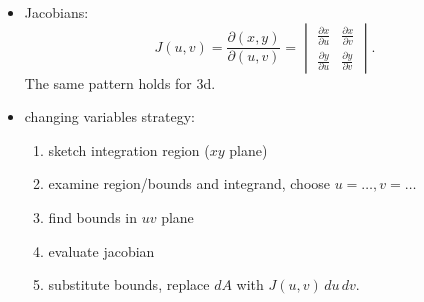 \documentclass[11pt]{article}
\theoremstyle{definition}
\begin{document}
\begin{multicols}{2}
{\begin{itemize}
\begin{itemize}
        if $T$ is one to one, $(\exists T^{-1})(T^{-1}\circ T, T\circ T^{-1})$ are id. fns.

        finding $\text{Im}_T G$? can try eval. each section of $G$'s boundry thru T.
      \end{itemize}
      \item Jacobians:
      \[ J(u,v) = \frac{\partial(x,y)}{\partial(u,v)} = \begin{vmatrix}
        \frac{\partial{x}}{\partial{u}}& \frac{\partial{x}}{\partial{v}} \\
        \frac{\partial{y}}{\partial{u}}& \frac{\partial{y}}{\partial{v}}
      \end{vmatrix}. \]
      The same pattern holds for 3d.
      \item changing variables strategy:
      \begin{enumerate}
        \item sketch integration region ($xy$ plane)
        \item examine region/bounds and integrand, choose $u=\dots, v=\dots$
        \item find bounds in $uv$ plane
        \item evaluate jacobian
        \item substitute bounds, replace $dA$ with $J(u,v)\,du\,dv$.
      \end{enumerate}
    \end{itemize}



  }
\end{multicols}
\end{document}
